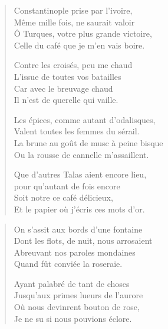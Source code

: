 \begin{verse}%
  \quatrain%
  Constantinople prise par l’ivoire,\\  %
  Même mille fois, ne saurait valoir\\  %
  Ô Turques, votre plus grande victoire,\\  %
  Celle du café que je m’en vais boire.

  Contre les croisés, peu me chaud\\  %
  L’issue de toutes vos batailles\\  %
  Car avec le breuvage chaud\\  %
  Il n’est de querelle qui vaille.

  Les épices, comme autant d’odalisques,\\  %
  Valent toutes les femmes du sérail.\\  %
  La brune au goût de musc à peine bisque\\  %
  Ou la rousse de cannelle m’assaillent.

  Que d’autres Talas aient encore lieu,\\  %
   pour qu’autant de fois encore\\  %
  Soit notre ce café délicieux,\\  %
  Et le papier où j’écris ces mots d’or.
\end{verse}

\begin{verse}%
  \quatrain%
  On s’assit aux bords d’une fontaine\\  %
  Dont les flots, de nuit, nous arrosaient\\  %
  Abreuvant nos paroles mondaines\\  %
  Quand fût conviée la roseraie.

  Ayant palabré de tant de choses\\  %
  Jusqu’aux primes lueurs de l’aurore\\  %
  Où nous devinrent bouton de rose,\\  %
  Je ne su si nous pouvions éclore.
\end{verse}


